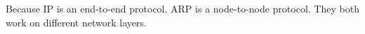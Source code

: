 Because IP is an end-to-end protocol. ARP is a node-to-node protocol. They both work on different network layers.